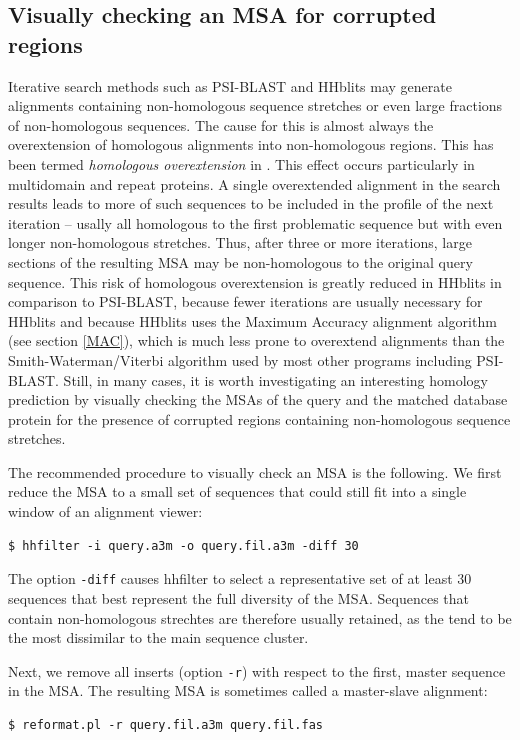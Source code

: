 \documentclass[11pt,a4paper]{article}
\begin{document}
\subsection{Visually checking an MSA for corrupted regions}

Iterative search methods such as PSI-BLAST and HHblits may generate alignments containing non-homologous sequence stretches or even large fractions of non-homologous sequences. The cause for this is almost always the overextension of homologous alignments into non-homologous regions. This has been termed \emph{homologous overextension} in \cite{Gonzalez:2010}. This effect occurs particularly in multidomain and repeat proteins. A single overextended alignment in the search results leads to more of such sequences to be included in the profile of the next iteration -- usally all homologous to the first problematic sequence but with even longer non-homologous stretches. Thus, after three or more iterations, large sections of the resulting MSA may be non-homologous to the original query sequence. This risk of homologous overextension is greatly reduced in HHblits in comparison to PSI-BLAST, because fewer iterations are usually necessary for HHblits and because HHblits uses the Maximum Accuracy alignment algorithm (see section \ref{MAC}), which is much less prone to overextend alignments than the Smith-Waterman/Viterbi algorithm used by most other programs including PSI-BLAST. Still, in many cases, it is worth investigating an interesting homology prediction by visually checking the MSAs of the query and the matched database protein for the presence of corrupted regions containing non-homologous sequence stretches. 

The recommended procedure to visually check an MSA is the following. We first reduce the MSA to a small set of sequences that could still fit into a single window of an alignment viewer:
\begin{verbatim}
$ hhfilter -i query.a3m -o query.fil.a3m -diff 30
\end{verbatim}
The option \verb`-diff` causes hhfilter to select a representative set of at least 30 sequences that best represent the full diversity of the MSA. Sequences that contain non-homologous strechtes are therefore usually retained, as the tend to be the most dissimilar to the main sequence cluster. 

Next, we remove all inserts (option \verb`-r`) with respect to the first, master sequence in the MSA. The resulting MSA is sometimes called a master-slave alignment:
\begin{verbatim}
$ reformat.pl -r query.fil.a3m query.fil.fas
\end{verbatim}
\end{document}
